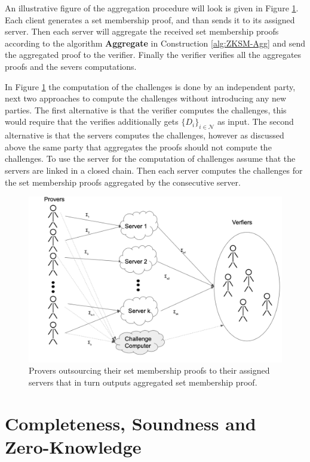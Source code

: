 An illustrative figure of the aggregation procedure will look is given in  Figure \ref{fig:workflow}. Each client generates a set membership proof, and than sends it to its assigned server. Then each server will aggregate the received set membership proofs according to the algorithm \textbf{Aggregate} in Construction \ref{alg:ZKSM-Agg} and send the aggregated proof to the verifier. Finally the verifier verifies all the aggregates proofs and the severs computations.

In Figure \ref{fig:workflow} the computation of the challenges is done by an independent party, next two approaches to compute the challenges without introducing any new parties. The first alternative is that the verifier computes the challenges, this would require that the verifies additionally gets $\{D_i\}_{i\in\mathcal{N}}$ as input. The second alternative is that the servers computes the challenges, however as discussed above the same party that aggregates the proofs should not compute the challenges. To use the server for the computation of challenges assume that the servers are linked in a closed chain. Then each server computes the challenges for the set membership proofs aggregated by the consecutive server.  

 \begin{figure}[]
\caption{Provers outsourcing their set membership proofs to their assigned servers that in turn outputs aggregated set membership proof. }
\label{fig:workflow}
\includegraphics[width=\linewidth]{./figure/workflow_challanger.png}
\end{figure} 

\section{Completeness, Soundness and Zero-Knowledge}

